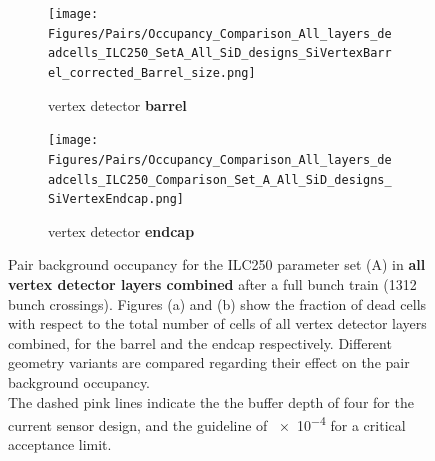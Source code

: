  \begin{figure}
 \centering
   \begin{subfigure}[b]{0.49\textwidth}
   \centering
    \texttt{[image: Figures/Pairs/Occupancy\_Comparison\_All\_layers\_deadcells\_ILC250\_SetA\_All\_SiD\_designs\_SiVertexBarrel\_corrected\_Barrel\_size.png]}
       \caption{\sid vertex detector \textbf{barrel}}
   \end{subfigure}
   \hfill
    \begin{subfigure}[b]{0.49\textwidth}
   \centering
    \texttt{[image: Figures/Pairs/Occupancy\_Comparison\_All\_layers\_deadcells\_ILC250\_Comparison\_Set\_A\_All\_SiD\_designs\_SiVertexEndcap.png]}
       \caption{\sid vertex detector \textbf{endcap}}
   \end{subfigure}
   \caption[Pair background occupancy in the \sid vertex detector for the ILC250 set (A) for different \sid geometry variants]{Pair background occupancy for the ILC250 parameter set (A) in \textbf{all \sid vertex detector layers combined} after a full bunch train (\num{1312} bunch crossings).
   Figures (a) and (b) show the fraction of dead cells with respect to the total number of cells of all vertex detector layers combined, for the barrel and the endcap respectively.
   Different \sid geometry variants are compared regarding their effect on the pair background occupancy.
   \\The dashed pink lines indicate the the buffer depth of four for the current sensor design, and the guideline of \num{e-4} for a critical acceptance limit.
   }
   \label{fig:PairBkg:ILC250_Occupancy_SetA}
 \end{figure}

